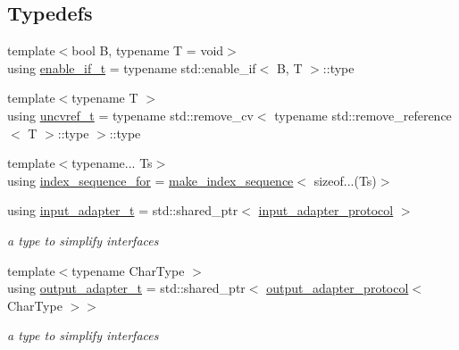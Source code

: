 \subsection*{Typedefs}
\begin{DoxyCompactItemize}
\item 
{\footnotesize template$<$bool B, typename T  = void$>$ }\\using \hyperlink{namespacenlohmann_1_1detail_a02bcbc878bee413f25b985ada771aa9c}{enable\+\_\+if\+\_\+t} = typename std\+::enable\+\_\+if$<$ B, T $>$\+::type
\item 
{\footnotesize template$<$typename T $>$ }\\using \hyperlink{namespacenlohmann_1_1detail_a53a082eedad9f4729fcd8fed552a21f7}{uncvref\+\_\+t} = typename std\+::remove\+\_\+cv$<$ typename std\+::remove\+\_\+reference$<$ T $>$\+::type $>$\+::type
\item 
{\footnotesize template$<$typename... Ts$>$ }\\using \hyperlink{namespacenlohmann_1_1detail_a24800493c6ec02ce033dcbb47b7fd28e}{index\+\_\+sequence\+\_\+for} = \hyperlink{structnlohmann_1_1detail_1_1make__index__sequence}{make\+\_\+index\+\_\+sequence}$<$ sizeof...(Ts)$>$
\item 
using \hyperlink{namespacenlohmann_1_1detail_ae132f8cd5bb24c5e9b40ad0eafedf1c2}{input\+\_\+adapter\+\_\+t} = std\+::shared\+\_\+ptr$<$ \hyperlink{structnlohmann_1_1detail_1_1input__adapter__protocol}{input\+\_\+adapter\+\_\+protocol} $>$
\begin{DoxyCompactList}\small\item\em a type to simplify interfaces \end{DoxyCompactList}\item 
{\footnotesize template$<$typename Char\+Type $>$ }\\using \hyperlink{namespacenlohmann_1_1detail_a0fd8edff7729aa2dd92b070964bade2e}{output\+\_\+adapter\+\_\+t} = std\+::shared\+\_\+ptr$<$ \hyperlink{structnlohmann_1_1detail_1_1output__adapter__protocol}{output\+\_\+adapter\+\_\+protocol}$<$ Char\+Type $>$$>$
\begin{DoxyCompactList}\small\item\em a type to simplify interfaces \end{DoxyCompactList}\end{DoxyCompactItemize}
